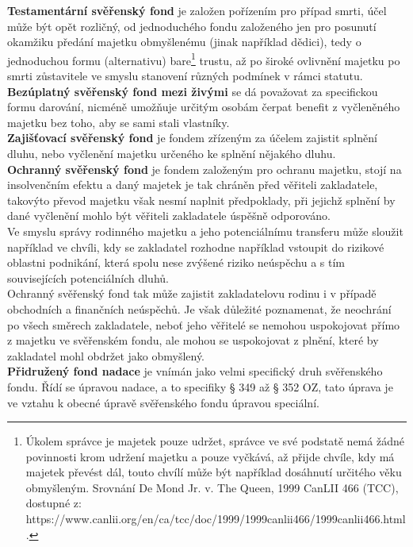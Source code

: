 \documentclass{article}
\begin{document}
\textbf{Testamentární svěřenský fond} je založen pořízením pro případ smrti, účel může být opět rozličný, od jednoduchého fondu založeného jen pro posunutí okamžiku předání majetku obmyšlenému (jinak například dědici), tedy o jednoduchou formu (alternativu) bare\footnote{Úkolem správce je majetek pouze udržet, správce ve své podstatě nemá žádné povinnosti krom udržení majetku a pouze vyčkává, až přijde chvíle, kdy má majetek převést dál, touto chvílí může být například dosáhnutí určitého věku obmyšleným. Srovnání De Mond Jr. v. The Queen, 1999 CanLII 466 (TCC), dostupné z: https://www.canlii.org/en/ca/tcc/doc/1999/1999canlii466/1999canlii466.html.} trustu, až po široké ovlivnění majetku po smrti zůstavitele ve smyslu stanovení různých podmínek v rámci statutu.\\

\textbf{Bezúplatný svěřenský fond mezi živými} se dá považovat za specifickou formu darování, nicméně umožňuje určitým osobám čerpat benefit z vyčleněného majetku bez toho, aby se sami stali vlastníky.\\

\textbf{Zajišťovací svěřenský fond} je fondem zřízeným za účelem zajistit splnění dluhu, nebo vyčlenění majetku určeného ke splnění nějakého dluhu.\\

\textbf{Ochranný svěřenský fond} je fondem založeným pro ochranu majetku, stojí na insolvenčním efektu a daný majetek je tak chráněn před věřiteli zakladatele, takovýto převod majetku však nesmí naplnit předpoklady, při jejichž splnění by dané vyčlenění mohlo být věřiteli zakladatele úspěšně odporováno.\\

Ve smyslu správy rodinného majetku a jeho potenciálnímu transferu může sloužit například ve chvíli, kdy se zakladatel rozhodne například vstoupit do rizikové oblastni podnikání, která spolu nese zvýšené riziko neúspěchu a s tím souvisejících potenciálních dluhů.\\

Ochranný svěřenský fond tak může zajistit zakladatelovu rodinu i v případě obchodních a finančních neúspěchů. Je však důležité poznamenat, že neochrání po všech směrech zakladatele, neboť jeho věřitelé se nemohou uspokojovat přímo z majetku ve svěřenském fondu, ale mohou se uspokojovat z plnění, které by zakladatel mohl obdržet jako obmyšlený.\\

\textbf{Přidružený fond nadace} je vnímán jako velmi specifický druh svěřenského fondu. Řídí se úpravou nadace, a to specifiky § 349 až § 352 OZ, tato úprava je ve vztahu k obecné úpravě svěřenského fondu úpravou speciální.\\
\end{document}
